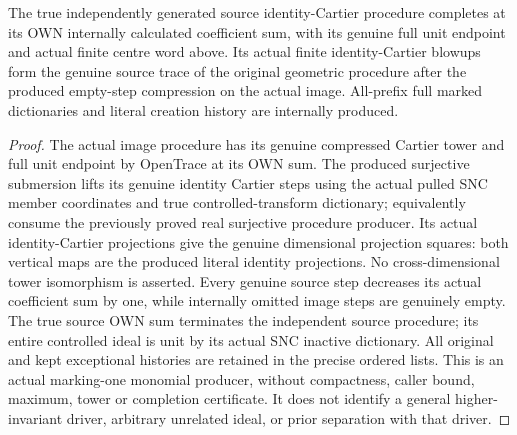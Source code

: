 \begin{theorem}
\label{hir:submersion-image-trace-completion}
\leanok
{}
The true independently generated source identity-Cartier procedure completes at its OWN internally calculated coefficient sum, with its genuine full unit endpoint and actual finite centre word above. Its actual finite identity-Cartier blowups form the genuine source trace of the original geometric procedure after the produced empty-step compression on the actual image. All-prefix full marked dictionaries and literal creation history are internally produced.
\end{theorem}
\begin{proof}
The actual image procedure has its genuine compressed Cartier tower and full unit endpoint by OpenTrace at its OWN sum. The produced surjective submersion lifts its genuine identity Cartier steps using the actual pulled SNC member coordinates and true controlled-transform dictionary; equivalently consume the previously proved real surjective procedure producer. Its actual identity-Cartier projections give the genuine dimensional projection squares: both vertical maps are the produced literal identity projections. No cross-dimensional tower isomorphism is asserted. Every genuine source step decreases its actual coefficient sum by one, while internally omitted image steps are genuinely empty. The true source OWN sum terminates the independent source procedure; its entire controlled ideal is unit by its actual SNC inactive dictionary. All original and kept exceptional histories are retained in the precise ordered lists. This is an actual marking-one monomial producer, without compactness, caller bound, maximum, tower or completion certificate. It does not identify a general higher-invariant driver, arbitrary unrelated ideal, or prior separation with that driver.
\end{proof}
